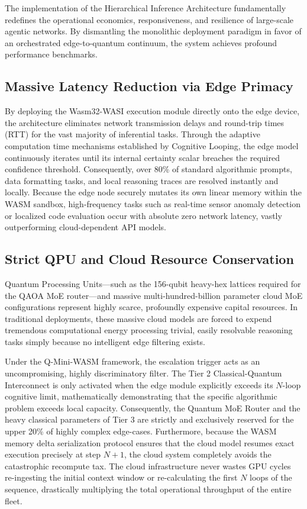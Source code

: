 \documentclass[11pt,a4paper]{article}
\begin{document}
The implementation of the Hierarchical Inference Architecture fundamentally redefines the operational economics, responsiveness, and resilience of large-scale agentic networks. By dismantling the monolithic deployment paradigm in favor of an orchestrated edge-to-quantum continuum, the system achieves profound performance benchmarks.

\subsection{Massive Latency Reduction via Edge Primacy}

By deploying the Wasm32-WASI execution module directly onto the edge device, the architecture eliminates network transmission delays and round-trip times (RTT) for the vast majority of inferential tasks. Through the adaptive computation time mechanisms established by Cognitive Looping, the edge model continuously iterates until its internal certainty scalar breaches the required confidence threshold. Consequently, over 80\% of standard algorithmic prompts, data formatting tasks, and local reasoning traces are resolved instantly and locally. Because the edge node securely mutates its own linear memory within the WASM sandbox, high-frequency tasks such as real-time sensor anomaly detection or localized code evaluation occur with absolute zero network latency, vastly outperforming cloud-dependent API models.

\subsection{Strict QPU and Cloud Resource Conservation}

Quantum Processing Units---such as the 156-qubit heavy-hex lattices required for the QAOA MoE router---and massive multi-hundred-billion parameter cloud MoE configurations represent highly scarce, profoundly expensive capital resources. In traditional deployments, these massive cloud models are forced to expend tremendous computational energy processing trivial, easily resolvable reasoning tasks simply because no intelligent edge filtering exists.

Under the Q-Mini-WASM framework, the escalation trigger acts as an uncompromising, highly discriminatory filter. The Tier 2 Classical-Quantum Interconnect is only activated when the edge module explicitly exceeds its $N$-loop cognitive limit, mathematically demonstrating that the specific algorithmic problem exceeds local capacity. Consequently, the Quantum MoE Router and the heavy classical parameters of Tier 3 are strictly and exclusively reserved for the upper 20\% of highly complex edge-cases. Furthermore, because the WASM memory delta serialization protocol ensures that the cloud model resumes exact execution precisely at step $N+1$, the cloud system completely avoids the catastrophic recompute tax. The cloud infrastructure never wastes GPU cycles re-ingesting the initial context window or re-calculating the first $N$ loops of the sequence, drastically multiplying the total operational throughput of the entire fleet.
\end{document}
